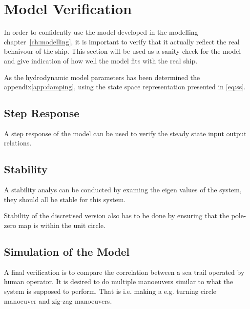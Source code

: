 \section{Model Verification}
\label{sec:model_verification}
In order to confidently use the model developed in the modelling chapter~\vref{ch:modelling}, it is important to verify that it actually reflect the real behaivour of the ship. This section will be used as a sanity check for the model and give indication of how well the model fits with the real ship.

As the hydrodynamic model parameters has been determined the appendix\vref{app:damping}, using the state space representation presented in \vref{eq:ss}.

\subsection{Step Response}
A step response of the model can be used to verify the steady state input output relations.

\subsection{Stability}
A stability analys can be conducted by examing the eigen values of the system, they should all be stable for this system.

Stability of the discretised version also has to be done by ensuring that the pole-zero map is within the unit circle.

\subsection{Simulation of the Model}
A final verification is to compare the correlation between a sea trail operated by human operator. It is desired to do multiple manoeuvers similar to what the system is supposed to perform. That is i.e. making a e.g. turning circle manoeuver and zig-zag manoeuvers.
